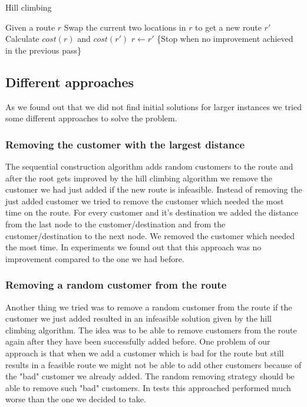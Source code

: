 \documentclass[fleqn]{scrartcl}
\begin{document}
\begin{algorithm}
\caption{Hill climbing}
\label{hillclimb}
\begin{algorithmic}[1]
\State Given a route $r$
\Repeat
{}
\State Swap the current two locations in $r$ to get a new route $r'$
\State Calculate $cost(r)$ and $cost(r')$
\State $r \gets r'$
\EndIf
\EndIf
\EndFor
{} \{Stop when no improvement achieved in the previous pass\}
\end{algorithmic}
\end{algorithm}


\subsection{Different approaches}

As we found out that we did not find initial solutions for larger instances we tried some different approaches to solve the problem.
\newpage

\subsubsection{Removing the customer with the largest distance}
The sequential construction algorithm adds random customers to the route and after the root gets improved by the hill climbing algorithm we remove the customer we had just added if the new route is infeasible. Instead of removing the just added customer we tried to remove the customer which needed the most time on the route. For every customer and it's destination we added the distance from the last node to the customer/destination and from the customer/destination to the next node. We removed the customer which needed the most time. In experiments we found out that this approach was no improvement compared to the one we had before.

\subsubsection{Removing a random customer from the route}
Another thing we tried was to remove a random customer from the route if the customer we just added resulted in an infeasible solution given by the hill climbing algorithm. The idea was to be able to remove customers from the route again after they have been successfully added before. One problem of our approach is that when we add a customer which is bad for the route but still results in a feasible route we might not be able to add other customers because of the "bad" customer we already added. The random removing strategy should be able to remove such "bad" customers. In tests this approached performed much worse than the one we decided to take.  
\end{document}
